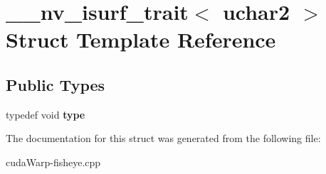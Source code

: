 \hypertarget{struct____nv__isurf__trait_3_01uchar2_01_4}{}\section{\+\_\+\+\_\+nv\+\_\+isurf\+\_\+trait$<$ uchar2 $>$ Struct Template Reference}
\label{struct____nv__isurf__trait_3_01uchar2_01_4}
\subsection*{Public Types}
\begin{DoxyCompactItemize}
\item 
typedef void {\bfseries type}\hypertarget{struct____nv__isurf__trait_3_01uchar2_01_4_abea9d4489db014316ac487b7f814ebc5}{}\label{struct____nv__isurf__trait_3_01uchar2_01_4_abea9d4489db014316ac487b7f814ebc5}

\end{DoxyCompactItemize}


The documentation for this struct was generated from the following file\+:\begin{DoxyCompactItemize}
\item 
cuda\+Warp-\/fisheye.\+cpp\end{DoxyCompactItemize}
